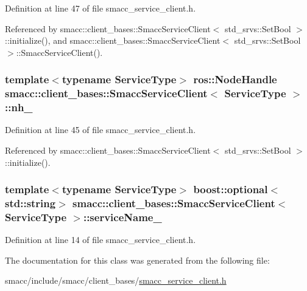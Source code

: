 Definition at line 47 of file smacc\+\_\+service\+\_\+client.\+h.



Referenced by smacc\+::client\+\_\+bases\+::\+Smacc\+Service\+Client$<$ std\+\_\+srvs\+::\+Set\+Bool $>$\+::initialize(), and smacc\+::client\+\_\+bases\+::\+Smacc\+Service\+Client$<$ std\+\_\+srvs\+::\+Set\+Bool $>$\+::\+Smacc\+Service\+Client().

\subsubsection[{\texorpdfstring{nh\+\_\+}{nh_}}]{\setlength{\rightskip}{0pt plus 5cm}template$<$typename Service\+Type$>$ ros\+::\+Node\+Handle {\bf smacc\+::client\+\_\+bases\+::\+Smacc\+Service\+Client}$<$ Service\+Type $>$\+::nh\+\_\+\hspace{0.3cm}{\ttfamily [protected]}}\hypertarget{classsmacc_1_1client__bases_1_1SmaccServiceClient_afb62982383b8269c7962cd1588537489}{}\label{classsmacc_1_1client__bases_1_1SmaccServiceClient_afb62982383b8269c7962cd1588537489}


Definition at line 45 of file smacc\+\_\+service\+\_\+client.\+h.



Referenced by smacc\+::client\+\_\+bases\+::\+Smacc\+Service\+Client$<$ std\+\_\+srvs\+::\+Set\+Bool $>$\+::initialize().

\subsubsection[{\texorpdfstring{service\+Name\+\_\+}{serviceName_}}]{\setlength{\rightskip}{0pt plus 5cm}template$<$typename Service\+Type$>$ boost\+::optional$<$std\+::string$>$ {\bf smacc\+::client\+\_\+bases\+::\+Smacc\+Service\+Client}$<$ Service\+Type $>$\+::service\+Name\+\_\+}\hypertarget{classsmacc_1_1client__bases_1_1SmaccServiceClient_a63732ec406cb8b6f65bbdbb73e01c7ab}{}\label{classsmacc_1_1client__bases_1_1SmaccServiceClient_a63732ec406cb8b6f65bbdbb73e01c7ab}


Definition at line 14 of file smacc\+\_\+service\+\_\+client.\+h.



The documentation for this class was generated from the following file\+:\begin{DoxyCompactItemize}
\item 
smacc/include/smacc/client\+\_\+bases/\hyperlink{smacc__service__client_8h}{smacc\+\_\+service\+\_\+client.\+h}\end{DoxyCompactItemize}
